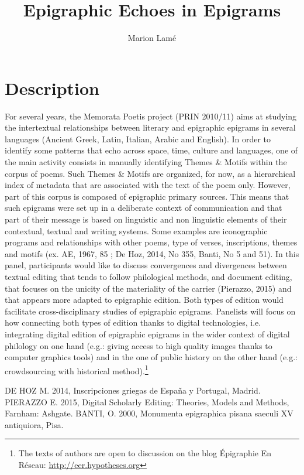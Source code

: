 \documentclass[amsthm,ebook]{saparticle}
\title{Epigraphic Echoes in Epigrams}
\author[CLUJ]{Marion Lam\'e\corref{first}}
\begin{document}
\maketitle



\section{Description}

For several years, the Memorata Poetis project (PRIN 2010/11) aims at studying the intertextual relationships between literary and epigraphic epigrams in several languages (Ancient Greek, Latin, Italian, Arabic and English). In order to identify some patterns that echo across space, time, culture and languages, one of the main activity consists in manually identifying Themes \& Motifs within the corpus of poems. Such Themes \& Motifs are organized, for now, as a hierarchical index of metadata that are associated with the text of the poem only. However, part of this corpus is composed of epigraphic primary sources. This means that such epigrams were set up in a deliberate context of communication and that part of their message is based on linguistic and non linguistic elements of their contextual, textual and writing systems. Some examples are iconographic programs and relationships with other poems, type of verses, inscriptions, themes and motifs (ex. AE, 1967, 85 ; De Hoz, 2014, No 355, Banti, No 5 and 51). In this panel, participants would like to discuss convergences and divergences between textual editing that tends to follow philological methods, and document editing, that focuses on the unicity of the materiality of the carrier (Pierazzo, 2015) and that appears more adapted to epigraphic edition. Both types of edition would facilitate cross-disciplinary studies of epigraphic epigrams. Panelists will focus on how connecting both types of edition thanks to digital technologies, i.e. integrating digital edition of epigraphic epigrams in the wider context of digital philology on one hand (e.g.: giving access to high quality images thanks to computer graphics tools) and in the one of public history on the other hand (e.g.: crowdsourcing with historical method).\footnote{The texts of authors are open to discussion on the blog Épigraphie En Réseau: \url{ http://eer.hypotheses.org}}

DE HOZ M. 2014, Inscripciones griegas de España y Portugal, Madrid. 
PIERAZZO E. 2015, Digital Scholarly Editing: Theories, Models and Methods, Farnham: Ashgate.
BANTI, O. 2000, Monumenta epigraphica pisana saeculi XV antiquiora, Pisa.
\end{document}

